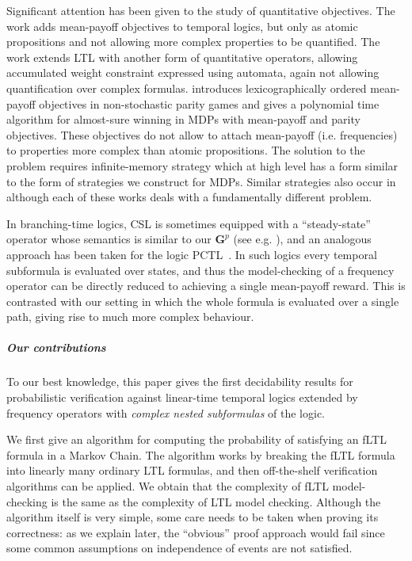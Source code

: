 \documentclass[a4paper,UKenglish]{lipics}
\newcommand{\Gf}[1]{\mathbf{G}^{#1}}
\begin{document}
Significant attention has been given to the study of quantitative objectives. The work \cite{boker2011temporal} adds mean-payoff objectives to temporal logics, but only as atomic propositions and not allowing more complex properties to be quantified. 
The work \cite{baier2014weight} extends LTL with another form of quantitative operators, allowing accumulated weight constraint expressed using automata, again not allowing quantification over complex formulas.
\cite{bloem2009better} introduces lexicographically ordered mean-payoff objectives in non-stochastic parity games and \cite{chatterjee2011energy} gives a polynomial time algorithm for almost-sure winning in MDPs with mean-payoff and parity objectives. These objectives do not allow to attach mean-payoff (i.e. frequencies) to properties more complex than atomic propositions. The solution to the problem requires infinite-memory strategy which at high level has a form similar to the form of strategies we construct for MDPs. Similar strategies also occur in \cite{chatterjee2005mean,chatterjee2012games,BFK08} although each of these works deals with a fundamentally different problem.

In branching-time logics, CSL is sometimes equipped with a ``steady-state'' operator whose semantics is similar
to our $\Gf{p}$ (see e.g. \cite{BHHK00}), and an analogous approach has been taken for the logic PCTL~\cite{kuvcera2005controller,de1998specify}.
In such logics every temporal subformula
is evaluated over states, and thus the model-checking of a frequency operator can be directly reduced to achieving a single mean-payoff reward.
This is contrasted with our setting in which the whole formula is evaluated over a single path, giving rise to much more complex
behaviour.

\subparagraph{Our contributions}
To our best knowledge, this paper gives the first decidability results for probabilistic verification against linear-time temporal logics extended by frequency operators with \emph{complex nested subformulas} of the logic.

We first give an algorithm for computing the probability of satisfying an fLTL formula in a Markov Chain.
The algorithm works by breaking the fLTL formula into linearly many ordinary LTL formulas, and then off-the-shelf
verification algorithms can be applied. We obtain that the complexity of fLTL model-checking
is the same as the complexity of LTL model checking. Although the algorithm itself is very simple, some
care needs to be taken when proving its correctness: as we explain later, the ``obvious'' proof approach would fail
since some common assumptions on independence of events are not satisfied.
\end{document}
